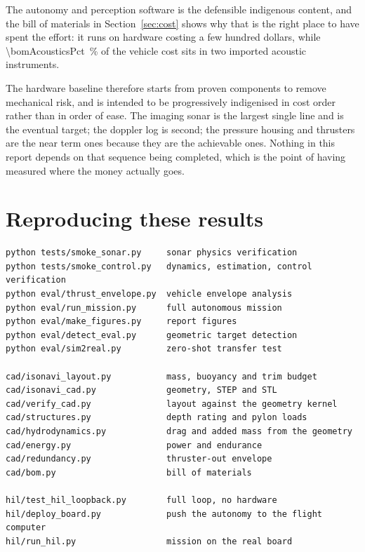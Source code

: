 \documentclass[10pt,a4paper]{article}
\begin{document}
The autonomy and perception software is the defensible indigenous content, and
the bill of materials in Section~\ref{sec:cost} shows why that is the right
place to have spent the effort: it runs on hardware costing a few hundred
dollars, while \SI{\bomAcousticsPct}{\percent} of the vehicle cost sits in two
imported acoustic instruments.

The hardware baseline therefore starts from proven components to remove
mechanical risk, and is intended to be progressively indigenised in cost order
rather than in order of ease. The imaging sonar is the largest single line and
is the eventual target; the doppler log is second; the pressure housing and
thrusters are the near term ones because they are the achievable ones. Nothing
in this report depends on that sequence being completed, which is the point of
having measured where the money actually goes.

\section*{Reproducing these results}

\begin{minipage}{\linewidth}
\begin{verbatim}
python tests/smoke_sonar.py     sonar physics verification
python tests/smoke_control.py   dynamics, estimation, control verification
python eval/thrust_envelope.py  vehicle envelope analysis
python eval/run_mission.py      full autonomous mission
python eval/make_figures.py     report figures
python eval/detect_eval.py      geometric target detection
python eval/sim2real.py         zero-shot transfer test

cad/isonavi_layout.py           mass, buoyancy and trim budget
cad/isonavi_cad.py              geometry, STEP and STL
cad/verify_cad.py               layout against the geometry kernel
cad/structures.py               depth rating and pylon loads
cad/hydrodynamics.py            drag and added mass from the geometry
cad/energy.py                   power and endurance
cad/redundancy.py               thruster-out envelope
cad/bom.py                      bill of materials

hil/test_hil_loopback.py        full loop, no hardware
hil/deploy_board.py             push the autonomy to the flight computer
hil/run_hil.py                  mission on the real board
\end{verbatim}
\end{minipage}
\end{document}
